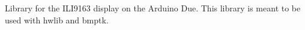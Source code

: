 Library for the ILI9163 display on the Arduino Due. This library is meant to be used with hwlib and bmptk. 